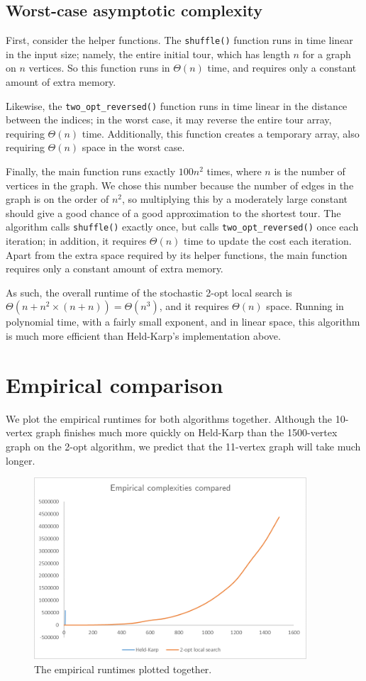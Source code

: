 \documentclass[10pt]{extarticle}
\begin{document}
\subsection{Worst-case asymptotic complexity}
First, consider the helper functions. The \verb|shuffle()| function runs in time
linear in the input size; namely, the entire initial tour, which has length $n$
for a graph on $n$ vertices. So this function runs in $\Theta(n)$ time, and 
requires only a constant amount of extra memory.

Likewise, the \verb|two_opt_reversed()| function runs in time linear in the
distance between the indices; in the worst case, it may reverse the entire 
tour array, requiring $\Theta(n)$ time. Additionally, this function creates a
temporary array, also requiring $\Theta(n)$ space in the worst case.

Finally, the main function runs exactly $100 n^2$ times, where $n$ is the 
number of vertices in the graph. We chose this number because the number of 
edges in the graph is on the order of $n^2$, so multiplying this by a moderately
large constant should give a good chance of a good approximation to the shortest
tour. The algorithm calls \verb|shuffle()| exactly once, but calls
\verb|two_opt_reversed()| once each iteration; in addition, it requires 
$\Theta(n)$ time to update the cost each iteration. Apart from the extra space
required by its helper functions, the main function requires only a constant 
amount of extra memory.

As such, the overall runtime of the stochastic 2-opt local search is
$\Theta(n + n^2 \times (n + n)) = \Theta(n^3)$, and it requires $\Theta(n)$
space. Running in polynomial time, with a fairly small exponent, and in linear
space, this algorithm is much more efficient than Held-Karp's implementation
above. \medskip



\section{Empirical comparison}
We plot the empirical runtimes for both algorithms together. Although the 10-
vertex graph finishes much more quickly on Held-Karp than the 1500-vertex
graph on the 2-opt algorithm, we predict that the 11-vertex graph will take
much longer.

\begin{figure}[ht]
    \centering
    \includegraphics[width=4in]{bothGraphed.png}
    \caption{The empirical runtimes plotted together.}
    \label{fig:3}
\end{figure}
\end{document}
